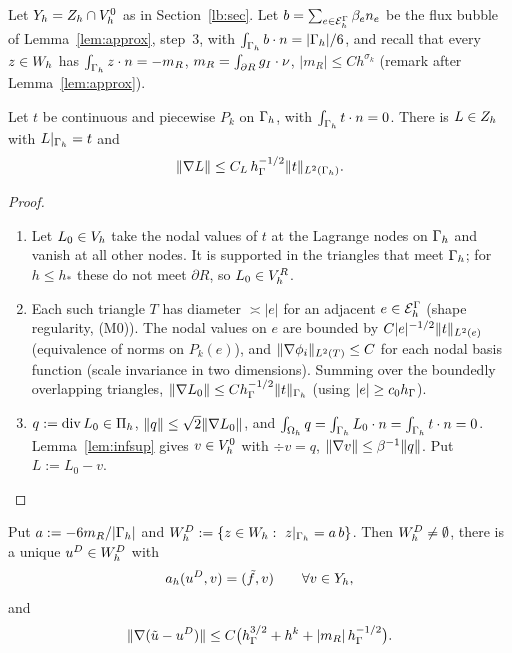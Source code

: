 Let $Y_h=Z_h\cap V_h^0$ as in Section~\ref{lb:sec}. Let $b=\sum_{e\in\mathcal E_h^\Gamma}\beta_en_e$ be the flux bubble of Lemma~\ref{lem:approx}, step~3, with $\int_{\Gamma_h}b\cdot n=|\Gamma_h|/6$, and recall that every $z\in W_h$ has $\int_{\Gamma_h}z\cdot n=-m_R$, $m_R=\int_{\partial R}g_I\cdot\nu$, $|m_R|\le Ch^{\sigma_k}$ (remark after Lemma~\ref{lem:approx}).

\begin{lemma}\label{rs:lift}
Let $t$ be continuous and piecewise $P_k$ on $\Gamma_h$, with $\int_{\Gamma_h}t\cdot n=0$. There is $L\in Z_h$ with $L|_{\Gamma_h}=t$ and
\[
\lVert \nabla L\rVert\le C_L\,h_\Gamma^{-1/2}\lVert t\rVert_{L^2(\Gamma_h)} .
\]
\end{lemma}

\begin{proof}
\begin{enumerate}
\item Let $L_0\in V_h$ take the nodal values of $t$ at the Lagrange nodes on $\Gamma_h$ and vanish at all other nodes. It is supported in the triangles that meet $\Gamma_h$; for $h\le h_\ast$ these do not meet $\partial R$, so $L_0\in V_h^R$.
\item Each such triangle $T$ has diameter $\asymp|e|$ for an adjacent $e\in\mathcal E_h^\Gamma$ (shape regularity, (M0)). The nodal values on $e$ are bounded by $C|e|^{-1/2}\lVert t\rVert_{L^2(e)}$ (equivalence of norms on $P_k(e)$), and $\lVert \nabla\phi_i\rVert_{L^2(T)}\le C$ for each nodal basis function (scale invariance in two dimensions). Summing over the boundedly overlapping triangles, $\lVert \nabla L_0\rVert\le Ch_\Gamma^{-1/2}\lVert t\rVert_{\Gamma_h}$ (using $|e|\ge c_0h_\Gamma$).
\item $q:=\operatorname{div} L_0\in\Pi_h$, $\lVert q\rVert\le\sqrt2\lVert \nabla L_0\rVert$, and $\int_{\Omega_h}q=\int_{\Gamma_h}L_0\cdot n=\int_{\Gamma_h}t\cdot n=0$. Lemma~\ref{lem:infsup} gives $v\in V_h^0$ with $\div v=q$, $\lVert \nabla v\rVert\le\beta^{-1}\lVert q\rVert$. Put $L:=L_0-v$.\qedhere
\end{enumerate}
\end{proof}

\begin{lemma}\label{rs:dir}
Put $a:=-6m_R/|\Gamma_h|$ and $W_h^D:=\{z\in W_h:\ z|_{\Gamma_h}=a\,b\}$. Then $W_h^D\neq\emptyset$, there is a unique $u^D\in W_h^D$ with
\[
a_h(u^D,v)=(\tilde f,v)\qquad\forall v\in Y_h,
\]
and
\[
\lVert \nabla(\tilde u-u^D)\rVert\le C\bigl(h_\Gamma^{3/2}+h^k+|m_R|\,h_\Gamma^{-1/2}\bigr).
\]
\end{lemma}

